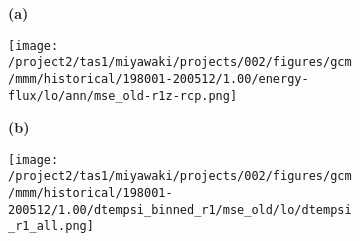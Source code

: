 \documentclass[preview]{standalone}
\begin{document}

% 


\begin{figure}

  \begin{subfigure}[t]{0.05\textwidth}
    \textbf{\large{(a)}}
  \end{subfigure}
  \begin{subfigure}[t]{0.85\textwidth}
    \texttt{[image: /project2/tas1/miyawaki/projects/002/figures/gcm/mmm/historical/198001-200512/1.00/energy-flux/lo/ann/mse\_old-r1z-rcp.png]}
  \end{subfigure}

  \begin{subfigure}[t]{0.07\textwidth}
    \textbf{\large{(b)}}
  \end{subfigure}
  \begin{subfigure}[t]{0.93\textwidth}
    \texttt{[image: /project2/tas1/miyawaki/projects/002/figures/gcm/mmm/historical/198001-200512/1.00/dtempsi\_binned\_r1/mse\_old/lo/dtempsi\_r1\_all.png]}
  \end{subfigure}

\end{figure}
\end{document}
